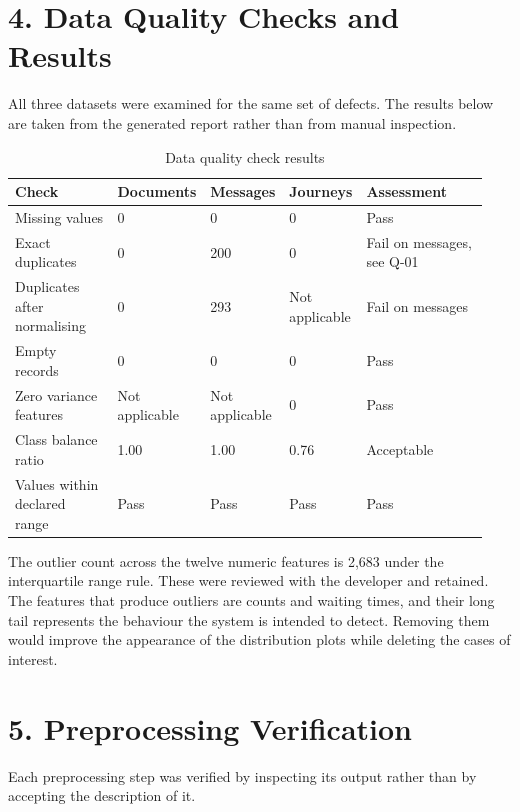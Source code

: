 \documentclass[11pt,a4paper]{article}
\begin{document}
\section{4. Data Quality Checks and Results}
All three datasets were examined for the same set of defects. The results below are taken from the generated report rather than from manual inspection.

\begin{table}[!t]
\centering
\caption{Data quality check results}
\small
\setlength{\tabcolsep}{3pt}
\begin{tabular}{p{0.230\linewidth}p{0.146\linewidth}p{0.146\linewidth}p{0.136\linewidth}p{0.282\linewidth}}
\toprule
\textbf{Check} & \textbf{Documents} & \textbf{Messages} & \textbf{Journeys} & \textbf{Assessment} \\
\midrule
Missing values & 0 & 0 & 0 & Pass \\
Exact duplicates & 0 & 200 & 0 & Fail on messages, see Q-01 \\
Duplicates after normalising & 0 & 293 & Not applicable & Fail on messages \\
Empty records & 0 & 0 & 0 & Pass \\
Zero variance features & Not applicable & Not applicable & 0 & Pass \\
Class balance ratio & 1.00 & 1.00 & 0.76 & Acceptable \\
Values within declared range & Pass & Pass & Pass & Pass \\
\bottomrule
\end{tabular}
\end{table}

The outlier count across the twelve numeric features is 2,683 under the interquartile range rule. These were reviewed with the developer and retained. The features that produce outliers are counts and waiting times, and their long tail represents the behaviour the system is intended to detect. Removing them would improve the appearance of the distribution plots while deleting the cases of interest.

\section{5. Preprocessing Verification}
Each preprocessing step was verified by inspecting its output rather than by accepting the description of it.
\end{document}
